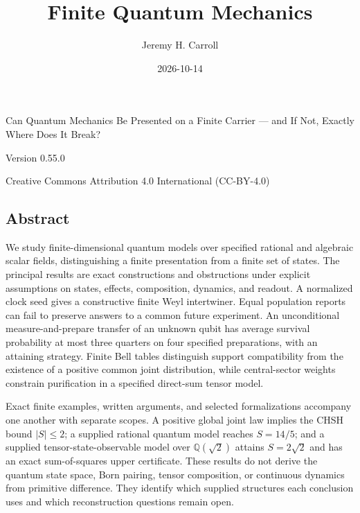 \documentclass[
  11pt,
]{article}
\title{Finite Quantum Mechanics}
\author{Jeremy H. Carroll}
\date{2026-10-14}
\begin{document}
\makeatletter
\begin{center}
{\LARGE\bfseries \@title\par}
\vspace{0.45em}
{\large Can Quantum Mechanics Be Presented on a Finite Carrier --- and If Not,
Exactly Where Does It Break?\par}
\vspace{0.8em}
{\normalsize \@author\par}
\vspace{0.5em}
{\small \@date\par}
\vspace{0.2em}
{\small Version 0.55.0\par}
\vspace{0.3em}
{\footnotesize Creative Commons Attribution 4.0 International (CC-BY-4.0)\par}
\end{center}
\makeatother

{
\hypersetup{linkcolor=}
\setcounter{tocdepth}{2}
\tableofcontents
}
\subsection{Abstract}\label{abstract}

We study finite-dimensional quantum models over specified rational and
algebraic scalar fields, distinguishing a finite presentation from a
finite set of states. The principal results are exact constructions and
obstructions under explicit assumptions on states, effects, composition,
dynamics, and readout. A normalized clock seed gives a constructive
finite Weyl intertwiner. Equal population reports can fail to preserve
answers to a common future experiment. An unconditional
measure-and-prepare transfer of an unknown qubit has average survival
probability at most three quarters on four specified preparations, with
an attaining strategy. Finite Bell tables distinguish support
compatibility from the existence of a positive common joint
distribution, while central-sector weights constrain purification in a
specified direct-sum tensor model.

Exact finite examples, written arguments, and selected formalizations
accompany one another with separate scopes. A positive global joint law
implies the CHSH bound \(|S|\leq 2\); a supplied rational quantum model
reaches \(S=14/5\); and a supplied tensor-state-observable model over
\(\mathbb Q(\sqrt 2)\) attains \(S=2\sqrt 2\) and has an exact
sum-of-squares upper certificate. These results do not derive the
quantum state space, Born pairing, tensor composition, or continuous
dynamics from primitive difference. They identify which supplied
structures each conclusion uses and which reconstruction questions
remain open.
\end{document}
